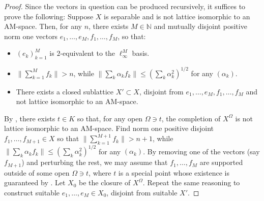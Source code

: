 \documentclass[12pt,leqno]{amsart}
\numberwithin{equation}{section}
\theoremstyle{definition}
\def\N{{\mathbb N}}
\begin{document}
\begin{proof}
Since the vectors in question can be produced recursively, it suffices to prove the following: Suppose $X$ is separable and is not lattice isomorphic to an AM-space. Then, for any $n$, there exists $M \in \N$ and mutually disjoint positive norm one vectors $e_1, \ldots, e_M, f_1, \ldots, f_M$, so that:
\begin{itemize}
    \item $(e_k)_{k=1}^M$ is $2$-equivalent to the $\ell_\infty^M$ basis.
    \item $\| \sum_{k=1}^M f_k \| > n$, while $\| \sum_k \alpha_k f_k \| \leq ( \sum_k \alpha_k^2 )^{1/2}$ for any $(\alpha_k)$.
    \item There exists a closed sublattice $X' \subset X$, disjoint from $e_1, \ldots, e_M, f_1, \ldots, f_M$ and not lattice isomorphic to an AM-space.
\end{itemize}

By , there exists $t \in K$ so that, for any open $\Omega \ni t$, the completion of $X^\Omega$ is not lattice isomorphic to an AM-space. Find norm one positive disjoint $f_1, \ldots, f_{M+1} \in X$ so that $\| \sum_{k=1}^{M+1} f_k \| > n+1$, while $\| \sum_k \alpha_k f_k \| \leq ( \sum_k \alpha_k^2 )^{1/2}$ for any $(\alpha_k)$.
By removing one of the vectors (say $f_{M+1}$) and perturbing the rest, we may assume that $f_1, \ldots, f_M$ are supported outside of some open $\Omega \ni t$, where $t$ is a special point whose existence is guaranteed by .
Let $X_0$ be the closure of $X^\Omega$. Repeat the same reasoning to construct suitable $e_1, \ldots, e_M \in X_0$, disjoint from suitable $X'$.
\end{proof}
\end{document}
